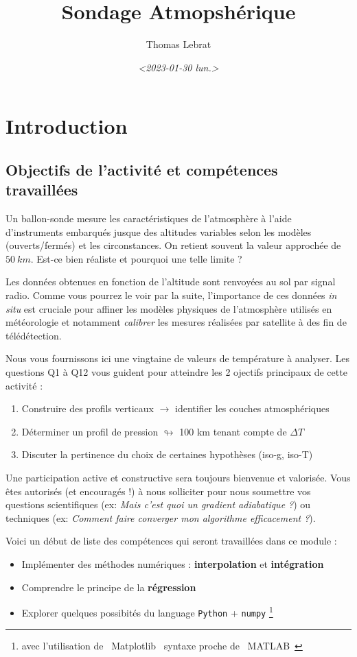\documentclass[letterpaper, 11pt]{article}
\author{Thomas Lebrat}
\date{\textit{<2023-01-30 lun.>}}
\title{Sondage Atmopshérique}
\begin{document}
\tableofcontents




\section{Introduction}
\label{sec:org0a299c7}

\subsection{Objectifs de l'activité et compétences travaillées}
\label{sec:org2a30731}

Un ballon-sonde mesure les caractéristiques de l'atmosphère à l'aide d'instruments embarqués jusque des altitudes variables selon les modèles (ouverts/fermés) et les circonstances. On retient souvent la valeur approchée de \(50~km\). Est-ce bien réaliste et pourquoi une telle limite ?

Les données obtenues en fonction de l'altitude sont renvoyées au sol par signal radio. Comme vous pourrez le voir par la suite, l'importance de ces données \emph{in situ} est cruciale pour affiner les modèles physiques de l'atmosphère utilisés en météorologie et notamment \emph{calibrer} les mesures réalisées par satellite à des fin de télédétection.

Nous vous fournissons ici une vingtaine de valeurs de température à analyser. Les questions Q1 à Q12 vous guident pour atteindre les 2 ojectifs principaux de cette activité : 

\begin{enumerate}
\item Construire des profils verticaux \(\rightarrow\) identifier les couches atmosphériques
\item Déterminer un profil de pression \(\looparrowright\) 100 km tenant compte de \(\Delta T\)
\item Discuter la pertinence du choix de certaines hypothèses (iso-g, iso-T)
\end{enumerate}

Une participation active et constructive sera toujours bienvenue et valorisée. Vous êtes autorisés (et encouragés !) à nous solliciter pour nous soumettre vos questions scientifiques (ex: \emph{Mais c'est quoi un gradient adiabatique ?}) ou techniques (ex: \emph{Comment faire converger mon algorithme efficacement ?}). 

Voici un début de liste des compétences qui seront travaillées dans ce module : 

\begin{itemize}
\item Implémenter des méthodes numériques : \textbf{interpolation} et \textbf{intégration}
\item Comprendre le principe de la \textbf{régression}
\item Explorer quelques possibités du language \texttt{Python} + \texttt{numpy} \footnote{avec l'utilisation de ~Matplotlib~ syntaxe proche de ~MATLAB~\texttrademark}
\end{itemize}
\end{document}
